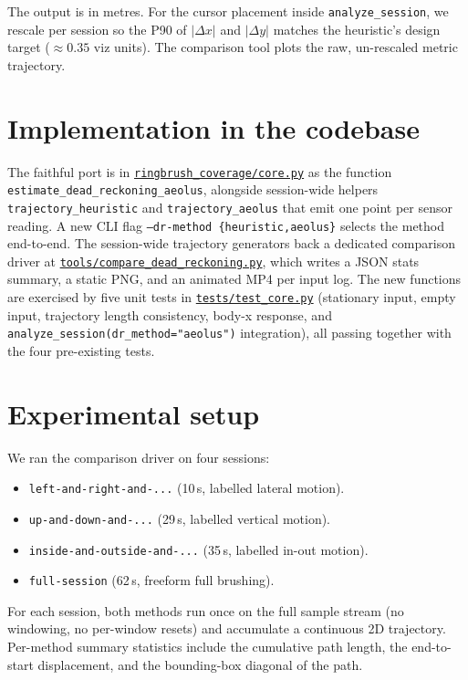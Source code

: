 \documentclass[a4paper,11pt]{article}
\begin{document}
The output is in metres. For the cursor placement inside
\texttt{analyze\_session}, we rescale per session so the P90 of $|\Delta x|$
and $|\Delta y|$ matches the heuristic's design target ($\approx 0.35$ viz
units). The comparison tool plots the raw, un-rescaled metric trajectory.

\section{Implementation in the codebase}

The faithful port is in
\href{../ringbrush_coverage/core.py}{\texttt{ringbrush\_coverage/core.py}} as
the function \texttt{estimate\_dead\_reckoning\_aeolus}, alongside session-wide
helpers \texttt{trajectory\_heuristic} and \texttt{trajectory\_aeolus} that emit
one point per sensor reading. A new CLI flag
\texttt{--dr-method \{heuristic,aeolus\}} selects the method end-to-end. The
session-wide trajectory generators back a dedicated comparison driver at
\href{../tools/compare_dead_reckoning.py}{\texttt{tools/compare\_dead\_reckoning.py}},
which writes a JSON stats summary, a static PNG, and an animated MP4 per input
log. The new functions are exercised by five unit tests in
\href{../tests/test_core.py}{\texttt{tests/test\_core.py}} (stationary input,
empty input, trajectory length consistency, body-x response, and
\texttt{analyze\_session(dr\_method="aeolus")} integration), all passing
together with the four pre-existing tests.

\section{Experimental setup}

We ran the comparison driver on four sessions:

\begin{itemize}
    \item \texttt{left-and-right-and-...} (10\,s, labelled lateral motion).
    \item \texttt{up-and-down-and-...} (29\,s, labelled vertical motion).
    \item \texttt{inside-and-outside-and-...} (35\,s, labelled in-out motion).
    \item \texttt{full-session} (62\,s, freeform full brushing).
\end{itemize}

For each session, both methods run once on the full sample stream (no
windowing, no per-window resets) and accumulate a continuous 2D trajectory.
Per-method summary statistics include the cumulative path length, the
end-to-start displacement, and the bounding-box diagonal of the path.
\end{document}
